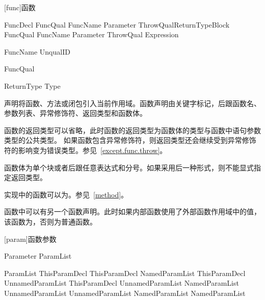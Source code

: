
[func]{函数}

\begin{bnf}{FuncDecl}
    FuncQual\bnfs {} FuncName Parameter ThrowQual\bnfq ReturnType\bnfq Block \br
    FuncQual\bnfs {} FuncName Parameter ThrowQual\bnfq \terminal{=>} Expression \terminal{;}
\end{bnf}

\begin{bnf}{FuncName}
    UnqualID \br
     \br
\end{bnf}

\begin{bnf}{FuncQual}
     \br
     \br
     \br
\end{bnf}

\begin{bnf}{ReturnType}
    \terminal{->} Type
\end{bnf}

\pnum
{}声明将函数、方法或闭包引入当前作用域。函数声明由关键字标记，后跟函数名、参数列表、异常修饰符、返回类型和函数体。

\pnum
函数的返回类型可以省略，此时函数的返回类型为函数体的类型与函数中语句参数类型的公共类型。
如果函数包含异常修饰符，则返回类型还会继续受到异常修饰符的影响变为错误类型。参见~\ref{except.func.throw}。

\pnum
函数体为单个块或者\tcode{=>}后跟任意表达式和分号。如果采用后一种形式，则不能显式指定返回类型。

\pnum
实现中的函数可以为。参见~\ref{method}。

\pnum
函数中可以有另一个函数声明。此时如果内部函数使用了外部函数作用域中的值，该函数为，否则为普通函数。

[param]{函数参数}

\begin{bnf}{Parameter}
    \terminal{(} ParamList\bnfq \terminal{)}
\end{bnf}

\begin{bnf}{ParamList}
    ThisParamDecl \br
    ThisParamDecl \terminal{,} NamedParamList \br
    ThisParamDecl \terminal{,} UnnamedParamList \br
    ThisParamDecl \terminal{,} UnnamedParamList \terminal{,} NamedParamList \br
    UnnamedParamList \br
    UnnamedParamList \terminal{,} NamedParamList \br
    NamedParamList
\end{bnf}

